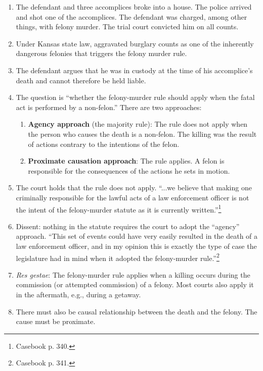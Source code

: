 \begin{enumerate}
    \item The defendant and three accomplices broke into a house. The police arrived and shot one of the accomplices. The defendant was charged, among other things, with felony murder. The trial court convicted him on all counts.
    \item Under Kansas state law, aggravated burglary counts as one of the inherently dangerous felonies that triggers the felony murder rule.
    \item The defendant argues that he was in custody at the time of his accomplice's death and cannot therefore be held liable.
    \item The question is ``whether the felony-murder rule should apply when the fatal act is performed by a non-felon.'' There are two approaches:
    \begin{enumerate}
        \item \textbf{Agency approach} (the majority rule): The rule does not apply when the person who causes the death is a non-felon. The killing was the result of actions contrary to the intentions of the felon.
        \item \textbf{Proximate causation approach}: The rule applies. A felon is responsible for the consequences of the actions he sets in motion.
    \end{enumerate}
    \item The court holds that the rule does not apply. ``...we believe that making one criminally responsible for the lawful acts of a law enforcement officer is not the intent of the felony-murder statute as it is currently written.''\footnote{Casebook p. 340.}
    \item Dissent: nothing in the statute requires the court to adopt the ``agency'' approach. ``This set of events could have very easily resulted in the death of a law enforcement officer, and in my opinion this is exactly the type of case the legislature had in mind when it adopted the felony-murder rule.''\footnote{Casebook p. 341.}
    \item \emph{Res gestae}: The felony-murder rule applies when a killing occurs during the commission (or attempted commission) of a felony. Most courts also apply it in the aftermath, e.g., during a getaway.
    \item There must also be causal relationship between the death and the felony. The cause must be proximate.
\end{enumerate}


